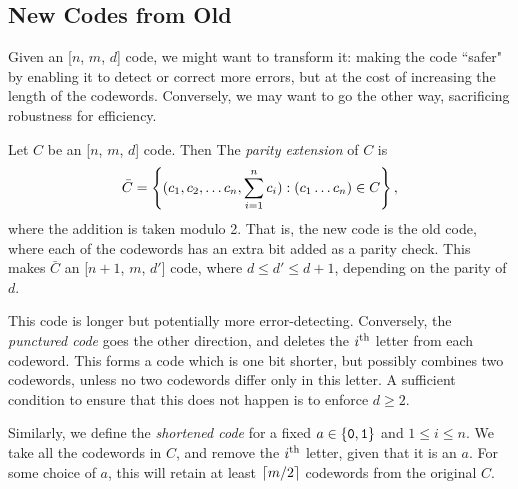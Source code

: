 \documentclass{article}
\begin{document}

\subsection{New Codes from Old}

Given an [$n$, $m$, $d$] code, we might want to transform it: making the code ``safer" by enabling it to detect or correct more errors, but at the cost of increasing the length of the codewords. Conversely, we may want to go the other way, sacrificing robustness for efficiency.

\begin{definition}
    Let $C$ be an [$n$, $m$, $d$] code. Then The \textit{parity extension} of $C$ is
    \[
	\bar C = \left\lbrace (c_1, c_2, \dots c_n, \sum_{i=1}^n c_i) : (c_1 \dots c_n) \in C \right\rbrace,
	\]
	where the addition is taken modulo 2. That is, the new code is the old code, where each of the codewords has an extra bit added as a parity check. This makes $\bar C$ an [$n+1$, $m$, $d'$] code, where $d \leq d' \leq d+1$, depending on the parity of $d$.
	
	This code is longer but potentially more error-detecting. Conversely, the \textit{punctured code} goes the other direction, and deletes the $i^{\text{th}}$ letter from each codeword. This forms a code which is one bit shorter, but possibly combines two codewords, unless no two codewords differ only in this letter. A sufficient condition to ensure that this does not happen is to enforce $d \geq 2$.
	
	Similarly, we define the \textit{shortened code} for a fixed $a \in \left\lbrace \texttt{0}, \texttt{1} \right\rbrace$ and $1 \leq i \leq n$. We take all the codewords in $C$, and remove the $i^{\text{th}}$ letter, given that it is an $a$. For some choice of $a$, this will retain at least $\left\lceil m/2\right\rceil$ codewords from the original $C$.
\end{definition}
\end{document}
